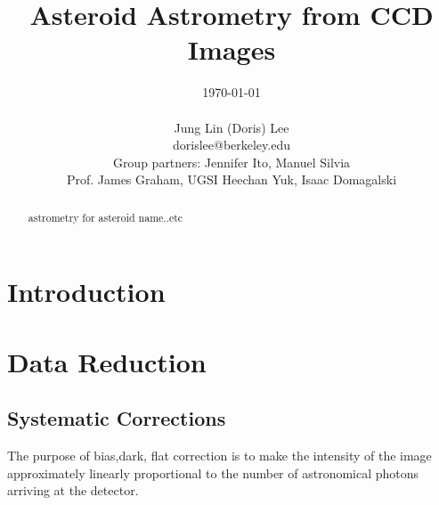 \documentclass[authoryear, 12pt,5p, times]{elsarticle}
\begin{document}
\begin{frontmatter}
\title{Asteroid Astrometry from CCD Images}
\author{\today \\ \quad \\Jung Lin (Doris) Lee\\ dorislee@berkeley.edu\\Group partners: Jennifer Ito, Manuel Silvia\\Prof. James Graham, UGSI Heechan Yuk, Isaac Domagalski}
	\begin{abstract}
astrometry for asteroid name..etc
	\end{abstract}
\end{frontmatter}
\section{Introduction}

\section{Data Reduction}
	
	\subsection{Systematic  Corrections}
The purpose of bias,dark, flat correction is to make the intensity of the image approximately linearly proportional to the number of astronomical photons arriving at the detector.
\end{document}
